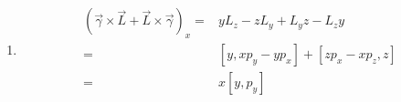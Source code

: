 \subsection{ }
\begin{enumerate}
\item 
\begin{equation}
\begin{aligned}
(\vec{\gamma} \times \vec{L} + \vec{L} \times \vec{\gamma})_{x} =& yL_{z}-zL_{y}+L_{y}z-L_{z}y \\
=& [y,xp_{y}-yp_{x}]+[zp_{x}-xp_{z},z] \\
=& x[y,p_{y}]
\end{aligned}
\end{equation}

\end{enumerate}